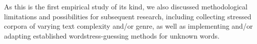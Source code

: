 \documentclass[11pt]{article}
\begin{document}
As this is the first empirical study of its kind, we also discussed 
methodological limitations and possibilities for subsequent research, including
collecting stressed corpora of varying text complexity and/or genre, as well as
implementing and/or adapting established wordstress-guessing methods for unknown 
words.

%



\end{document}

